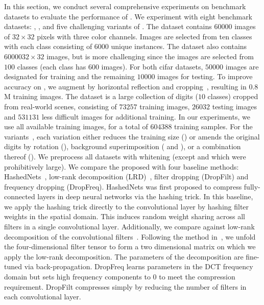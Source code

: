 \documentclass{article} %
\begin{document}
In this section, we conduct several comprehensive experiments on benchmark datasets to evaluate the performance of \abbrev{}.
We experiment with eight benchmark datasets: , ,  and five challenging variants of .
The  dataset contains $60000$ images of $32\times32$ pixels with three color channels.
Images are selected from ten classes with each class consisting of $6000$ unique instances.
The  dataset also contains $60000$$32\times32$ images, but is more challenging since the images are selected from $100$ classes (each class has 600 images).
For both {\sc cifar} datasets, $50000$ images are designated for training and the remaining $10000$ images for testing.
To improve accuracy on , we augment by horizontal reflection and cropping~\cite{krizhevsky2012imagenet}, resulting in $0.8$M training images.
The  dataset is a large collection of digits ($10$ classes) cropped from real-world scenes, consisting of $73257$ training images, $26032$ testing images and $531131$ less difficult images for additional training.
In our experiments, we use all available training images, for a total of $604388$ training samples.
For the  variants~\cite{larochelle2007empirical}, each variation either reduces the training size ({}) or amends the original digits by rotation ({}), background superimposition ({} and {}), or a combination thereof ({}).
We preprocess all datasets with whitening (except  and  which were prohibitively large).%
We compare the proposed \abbrev{} with four baseline methods:
HashedNets~\cite{chen2015compressing}, low-rank decomposition (LRD)~\cite{denil2013predicting}, filter dropping (DropFilt) and frequency dropping (DropFreq).
HashedNets was first proposed to compress fully-connected layers in deep neural networks via the hashing trick.
In this baseline, we apply the hashing trick directly to the convolutional layer by hashing filter weights in the spatial domain.
This induces random weight sharing across all filters in a single convolutional layer.
Additionally, we compare against low-rank decomposition of the convolutional filters~\cite{denil2013predicting}.
Following the method in~\cite{denton2014exploiting}, we unfold the four-dimensional filter tensor to form a two dimensional matrix on which we apply the low-rank decomposition.
The parameters of the decomposition are fine-tuned via back-propagation.
DropFreq learns parameters in the DCT frequency domain but sets high frequency components to $0$ to meet the compression requirement.
DropFilt compresses simply by reducing the number of filters in each convolutional layer.
\end{document}
